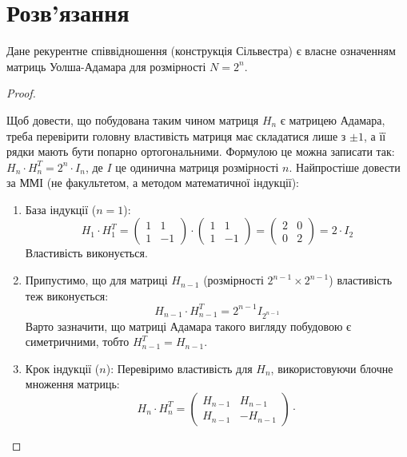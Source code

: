 \section{Розв'язання}
Дане рекурентне співвідношення (конструкція Сільвестра) є власне означенням матриць Уолша-Адамара для розмірності 
$N = 2^n$.
\begin{proof}
    ~\par Щоб довести, що побудована таким чином матриця $H_n$ є матрицею Адамара, треба перевірити головну властивість 
    матриця має складатися лише з $\pm 1$, а її рядки мають бути попарно ортогональними. Формулою це можна записати 
    так: $H_{n} \cdot H_{n}^{T} = 2^n \cdot I_{n}$, де $I$ це одинична матриця розмірності $n$. Найпростіше довести 
    за ММІ (не факультетом, а методом математичної індукції):
    \begin{enumerate}
        \item База індукції ($n = 1$):
            \begin{equation*} H_1 \cdot H_1^T = \begin{pmatrix} 1 & 1 \\ 1 & -1 \end{pmatrix} \cdot 
                \begin{pmatrix} 1 & 1 \\ 1 & -1 \end{pmatrix} = \begin{pmatrix} 2 & 0 \\ 0 & 2 \end{pmatrix} = 2 \cdot I_{2}
            \end{equation*}
            Властивість виконується.
        \item Припустимо, що для матриці $H_{n-1}$ (розмірності $2^{n-1} \times 2^{n-1}$) властивість теж виконується:
            \begin{equation*}
                H_{n-1} \cdot H_{n-1}^{T} = 2^{n-1} I_{2^{n-1}}
            \end{equation*}
            Варто зазначити, що матриці Адамара такого вигляду побудовою є симетричними, тобто $H_{n-1}^{T} = H_{n-1}$.
        \item Крок індукції ($n$): Перевіримо властивість для $H_{n}$, використовуючи блочне множення матриць:
            \begin{equation*}
                H_n \cdot H_n^T = \begin{pmatrix} H_{n-1} & H_{n-1} \\ H_{n-1} & -H_{n-1} \end{pmatrix} \cdot 

\end{equation*}
\end{enumerate}
\end{proof}
